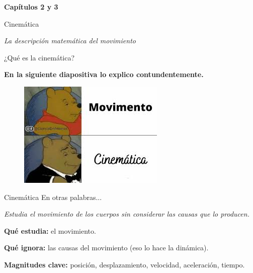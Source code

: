 \begin{frame}
\begin{center}
    \Huge \textbf{Capítulos 2 y 3}
    
    \LARGE Cinemática

    \textit{La descripción matemática del movimiento}
\end{center}
    
\end{frame}

\begin{frame}
    \begin{center}
        {\LARGE ¿Qué es la cinemática?}

        \vspace{2em}

        \textbf{En la siguiente diapositiva lo explico contundentemente.}
    \end{center}

    
\end{frame}

\begin{frame}
    \begin{figure}
    \centering
    \includegraphics[width=0.8\linewidth]{figures/meme2.jpeg}
\end{figure}
\end{frame}

\begin{frame}{Cinemática}
    En otras palabras...

    \vspace{1em}
    
    \begin{center}
        \textit{Estudia el movimiento de los cuerpos sin considerar las causas que lo producen.}
    \end{center}
    

    \vspace{1em}

    \textbf{Qué estudia:} el movimiento.

\textbf{Qué ignora:} las causas del movimiento (eso lo hace la dinámica).

\textbf{Magnitudes clave:} posición, desplazamiento, velocidad, aceleración, tiempo.
    
\end{frame}

